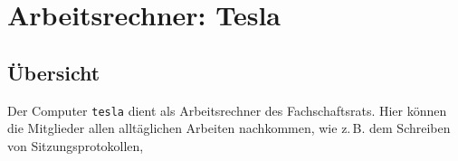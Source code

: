 \section{Arbeitsrechner: Tesla}
\label{tesla}
\subsection{Übersicht}
\label{tesla-uebersicht}

Der Computer \texttt{tesla} dient als Arbeitsrechner des Fachschaftsrats. Hier können die Mitglieder allen alltäglichen Arbeiten nachkommen, wie z.\,B. dem Schreiben von Sitzungsprotokollen,

